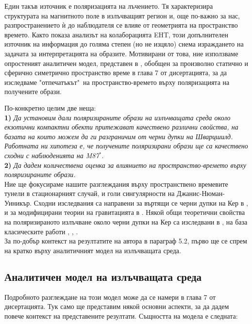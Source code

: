 \documentclass[12pt]{article}
\numberwithin{equation}{section}
\numberwithin{figure}{section}
\begin{document}
	Един такъв източник е поляризацията на лъчението. Тя характеризира структурата на магнитното поле в излъчващият регион и, още по-важно за нас, разпространението ѝ до наблюдателя се влияе от геометрията на пространство времето. Както показа анализът на колаборацията EHT, този допълнителен източник на информация до голяма степен (но не изцяло) снема израждането на задачата за интерпретацията на образите. Мотивирани от това, ние използваме опростеният аналитичен модел, представен в \cite{Narayan2021}, обобщен за произволно статично и сферично симетрично пространство време в глава 7 от дисертацията, за да изследваме "отпечатъкът"$\,$ на пространство-времето върху поляризацията на получените образи.\newpage
	
	По-конкретно целим две неща: \\
	
	\textbf{1)} \emph{Да установим дали поляризираните образи на излъчващата среда около екзотични компактни обекти притежават качествено различни свойства, на базата на които можем да ги разграничим от черни дупки на Шварцшилд. Работната ни хипотеза е, че получените поляризирани образи ще са качествено сходни с наблюденията на M87$^*$.}\\
	
	\textbf{2)} \emph{Да дадем количествена оценка за влиянието на пространство-времето върху поляризираните образи.}\\
	
	Ние ще фокусираме нашите разглеждания върху пространствено времевите тунели в стационарният случай, и голи сингулярности на Джанис-Нюман-Уиникър. Сходни изследвания са направени за въртящи се черни дупки на Кер в \cite{Gelles2021}, и за модифицирани теории на гравитацията в \cite{Qin2021}. Някой общи теоретични свойства на поляризираното излъчване около черни дупки на Кер са изследвани в \cite{Himwich2020}, на база класическите работи \cite{Luminet1979}, \cite{Connors1980}, \cite{Chen1991}.\\
	
	За по-добър контекст на резултатите на автора в параграф 5.2, първо ще се спрем на кратко върху аналитичният модел на излъчващата среда.

	\subsection{Аналитичен модел на излъчващата среда}
	
	Подробното разглеждане на този модел може да се намери в глава 7 от дисертацията. Тук само ще представим някой основни аспекти, за да дадем повече контекст на представените резултати. Същността на модела е следната:\\
	
\end{document}
